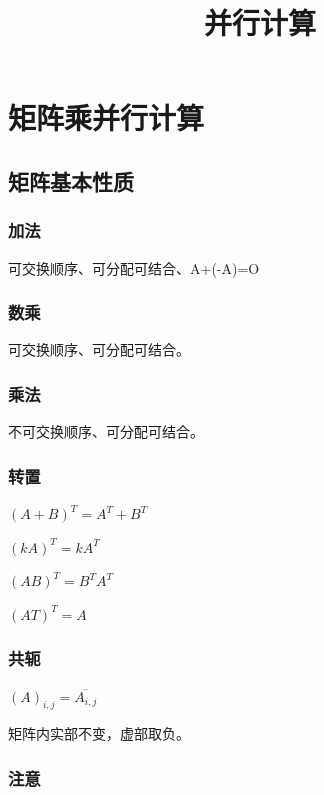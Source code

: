 \documentclass[UTF8]{article}%
\begin{document}

\title{并行计算}%
\maketitle%

\section{矩阵乘并行计算}

\subsection{矩阵基本性质}

\subsubsection{加法}

可交换顺序、可分配可结合、A+(-A)=O

\subsubsection{数乘}

可交换顺序、可分配可结合。

\subsubsection{乘法}

不可交换顺序、可分配可结合。

\subsubsection{转置}

$(A+B)^T=A^T+B^T$

$(kA)^T=kA^T$

$(AB)^T=B^{T}A^T$

$(AT)^T=A$

\subsubsection{共轭}

$(A)_{i,j}=\overline{A_{i,j}}$

矩阵内实部不变，虚部取负。

\subsubsection{注意}
\end{document}
